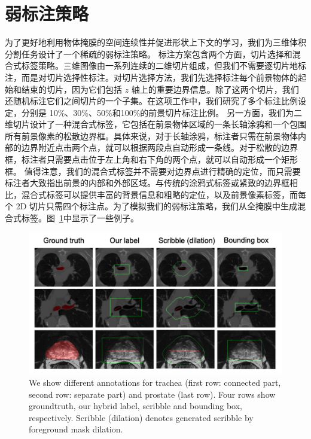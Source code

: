\section{弱标注策略}
为了更好地利用物体掩膜的空间连续性并促进形状上下文的学习，我们为三维体积分割任务设计了一个稀疏的弱标注策略。
标注方案包含两个方面，切片选择和混合式标签策略。三维图像由一系列连续的二维切片组成，但我们不需要逐切片地标注，而是对切片选择性标注。对切片选择方法，我们先选择标注每个前景物体的起始和结束的切片，因为它们包括 $z$ 轴上的重要边界信息。除了这两个切片，我们还随机标注它们之间切片的一个子集。在这项工作中，我们研究了多个标注比例设定，分别是 10\%、30\%、50\%和100\%的前景切片标注比例。
另一方面，我们为二维切片设计了一种混合式标签，它包括在前景物体区域的一条长轴涂鸦和一个包围所有前景像素的松散边界框。具体来说，对于长轴涂鸦，标注者只需在前景物体内部的边界附近点击两个点，就可以根据两段点自动形成一条线。对于松散的边界框，标注者只需要点击位于左上角和右下角的两个点，就可以自动形成一个矩形框。
值得注意，我们的混合式标签并不需要对边界点进行精确的定位，而只需要标注者大致指出前景的内部和外部区域。与传统的涂鸦式标签或紧致的边界框相比，混合式标签可以提供丰富的背景信息和粗略的定位，以及前景像素标签，而每个 2D 切片只需四个标注点。为了模拟我们的弱标注策略，我们从全掩膜中生成混合式标签。图~\ref{fig:weak_annotation}中显示了一些例子。

    \begin{figure}[t!]
        \centering 
        \includegraphics[width=1.0\textwidth]{img/c3/c_weak_annotation3.png}
        {We show different annotations for trachea (first row: connected part, second row: separate part) and prostate (last row). Four rows show groundtruth, our hybrid label, scribble and bounding box, respectively. Scribble (dilation) denotes generated scribble by foreground mask dilation.}
        \label{fig:weak_annotation}
    \end{figure}

